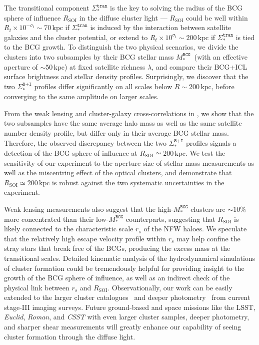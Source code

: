 \documentclass[fleqn,usenatbib]{mnras}
\newcommand{\rsoi}{R_{\mathrm{SOI}}}
\newcommand{\sigbi}{\Sigma_*^{\texttt{B+I}}}
\newcommand{\sigtr}{\Sigma_*^{\texttt{tran}}}
\newcommand{\msbcg}{M_*^{\texttt{BCG}}}
\newcommand{\kpc}{\mathrm{kpc}}
\begin{document}
The transitional component $\sigtr$ is the key to solving the radius of the
BCG sphere of influence $\rsoi$ in the diffuse cluster light --- $\rsoi$
could be well within $R_t{\times}10^{-\sigma_t}{\sim}70\,\kpc$ if $\sigtr$
is induced by the interaction between satellite galaxies and the cluster
potential, or extend to $R_t{\times}10^{\sigma_t}{\sim}200\,\kpc$ if
$\sigtr$ is tied to the BCG growth. To distinguish the two physical
scenarios, we divide the clusters into two subsamples by their BCG stellar
mass $\msbcg$~(with an effective aperture of ${\sim}50\,\kpc$) at fixed
satellite richness $\lambda$, and compare their BCG+ICL surface brightness
and stellar density profiles.  Surprisingly, we discover that the two
$\sigbi$ profiles differ significantly on all scales below
$R{\sim}200\,\kpc$, before converging to the same amplitude on larger
scales.


From the weak lensing and cluster-galaxy cross-correlations in
, we show that the two subsamples have the same average
halo mass as well as the same satellite number
density profile, but differ only in their average BCG stellar mass.
Therefore, the observed discrepancy between the two $\sigbi$ profiles
signals a detection of the BCG sphere of influence at
$\rsoi{\simeq}200\,\kpc$.  We test the sensitivity of our experiment to the
aperture size of stellar mass measurements as well as the miscentring
effect of the optical clusters, and demonstrate that $\rsoi{\simeq}200\,\kpc$ is
robust against the two systematic uncertainties in the experiment.


Weak lensing measurements also suggest that the high-$\msbcg$ clusters are
${\sim}10\%$ more concentrated than their low-$\msbcg$ counterparts,
suggesting that $\rsoi$ is likely connected to the characteristic scale
$r_s$ of the NFW haloes. We speculate that the relatively high escape
velocity profile within $r_s$ may help confine the stray stars that break
free of the BCGs, producing the excess mass at the transitional scales.
Detailed kinematic analysis of the hydrodynamical simulations of cluster
formation could be tremendously helpful for providing insight to the growth
of the BCG sphere of influence, as well as an indirect check of the
physical link between $r_s$ and $\rsoi$. Observationally, our work can be
easily extended to the larger cluster catalogues~\citep{Zou2021, Wen2021,
Yang2021} and deeper photometry~\citep{Huang2021, Li2021} from current
stage-III imaging surveys.  Future ground-based and space missions like the
LSST, {\it Euclid}, {\it Roman}, and {\it CSST} with even larger cluster
samples, deeper photometry, and sharper shear measurements will greatly
enhance our capability of seeing cluster formation through the diffuse
light.
\end{document}
